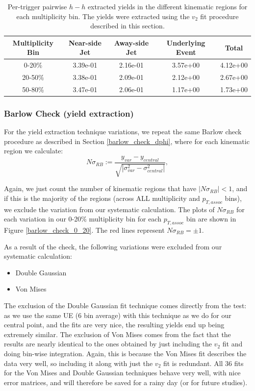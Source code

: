 \documentclass[ALICE,manyauthors]{ALICE_analysis_notes}
\begin{document}
\clearpage

\begin{table}[h!]
\centering
\begin{tabular}{| c || c | c | c | c | }
\hline
Multiplicity Bin & Near-side Jet & Away-side Jet & Underlying Event & Total  \\
\hline
0-20\% & 3.39e-01  & 2.16e-01  & 3.57e+00 & 4.12e+00 \\
20-50\% & 3.38e-01 & 2.09e-01  & 2.12e+00 & 2.67e+00 \\
50-80\% & 3.47e-01 & 2.06e-01  & 1.17e+00 & 1.73e+00 \\
\hline
\end{tabular}
\caption{Per-trigger pairwise $h-h$ extracted yields in the different kinematic regions for each multiplicity bin. The yields were extracted using the $v_{2}$ fit procedure described in this section.}
\label{h_h_yield_table_v2fit}
\end{table}

\subsubsection{Barlow Check (yield extraction)}
\label{barlow_check_yield}
For the yield extraction technique variations, we repeat the same Barlow check procedure as described in Section \ref{barlow_check_dphi}, where for each kinematic region we calculate:
\begin{equation}
	N\sigma_{RB} := \frac{y_{var} - y_{central}}{\sqrt{|\sigma_{var}^2 - \sigma_{central}^2|}},
\end{equation}

 Again, we just count the number of kinematic regions that have $|N\sigma_{RB}| < 1$, and if this is the majority of the regions (across ALL multiplicity and $p_{T, assoc}$ bins), we exclude the variation from our systematic calculation. The plots of $N\sigma_{RB}$ for each variation in our 0-20\% multiplicity bin for each $p_{T, assoc}$ bin are shown in Figure \ref{barlow_check_0_20}. The red lines represent $N\sigma_{RB} = \pm 1$.

As a result of the check, the following variations were excluded from our systematic calculation:
\begin{itemize}
\item Double Gaussian
\item Von Mises
\end{itemize}

The exclusion of the Double Gaussian fit technique comes directly from the test: as we use the same UE (6 bin average) with this technique as we do for our central point, and the fits are very nice, the resulting yields end up being extremely similar. The exclusion of Von Mises comes from the fact that the results are nearly identical to the ones obtained by just including the $v_{2}$ fit and doing bin-wise integration. Again, this is because the Von Mises fit describes the data very well, so including it along with just the $v_{2}$ fit is redundant. All 36 fits for the Von Mises and Double Gaussian techniques behave very well, with nice error matrices, and will therefore be saved for a rainy day (or for future studies).
\end{document}
